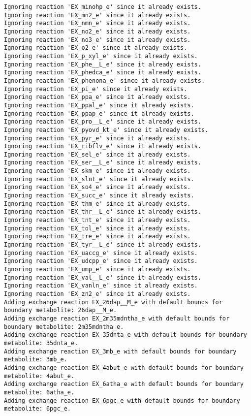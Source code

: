 \documentclass[
  letterpaper,
  DIV=11,
  numbers=noendperiod]{scrartcl}
\begin{document}
\begin{verbatim}
Ignoring reaction 'EX_minohp_e' since it already exists.
Ignoring reaction 'EX_mn2_e' since it already exists.
Ignoring reaction 'EX_nmn_e' since it already exists.
Ignoring reaction 'EX_no2_e' since it already exists.
Ignoring reaction 'EX_no3_e' since it already exists.
Ignoring reaction 'EX_o2_e' since it already exists.
Ignoring reaction 'EX_p_xyl_e' since it already exists.
Ignoring reaction 'EX_phe__L_e' since it already exists.
Ignoring reaction 'EX_phedca_e' since it already exists.
Ignoring reaction 'EX_phenona_e' since it already exists.
Ignoring reaction 'EX_pi_e' since it already exists.
Ignoring reaction 'EX_ppa_e' since it already exists.
Ignoring reaction 'EX_ppal_e' since it already exists.
Ignoring reaction 'EX_ppap_e' since it already exists.
Ignoring reaction 'EX_pro__L_e' since it already exists.
Ignoring reaction 'EX_pyovd_kt_e' since it already exists.
Ignoring reaction 'EX_pyr_e' since it already exists.
Ignoring reaction 'EX_ribflv_e' since it already exists.
Ignoring reaction 'EX_sel_e' since it already exists.
Ignoring reaction 'EX_ser__L_e' since it already exists.
Ignoring reaction 'EX_skm_e' since it already exists.
Ignoring reaction 'EX_slnt_e' since it already exists.
Ignoring reaction 'EX_so4_e' since it already exists.
Ignoring reaction 'EX_succ_e' since it already exists.
Ignoring reaction 'EX_thm_e' since it already exists.
Ignoring reaction 'EX_thr__L_e' since it already exists.
Ignoring reaction 'EX_tnt_e' since it already exists.
Ignoring reaction 'EX_tol_e' since it already exists.
Ignoring reaction 'EX_tre_e' since it already exists.
Ignoring reaction 'EX_tyr__L_e' since it already exists.
Ignoring reaction 'EX_uaccg_e' since it already exists.
Ignoring reaction 'EX_udcpp_e' since it already exists.
Ignoring reaction 'EX_ump_e' since it already exists.
Ignoring reaction 'EX_val__L_e' since it already exists.
Ignoring reaction 'EX_vanln_e' since it already exists.
Ignoring reaction 'EX_zn2_e' since it already exists.
Adding exchange reaction EX_26dap__M_e with default bounds for boundary metabolite: 26dap__M_e.
Adding exchange reaction EX_2m35mdntha_e with default bounds for boundary metabolite: 2m35mdntha_e.
Adding exchange reaction EX_35dnta_e with default bounds for boundary metabolite: 35dnta_e.
Adding exchange reaction EX_3mb_e with default bounds for boundary metabolite: 3mb_e.
Adding exchange reaction EX_4abut_e with default bounds for boundary metabolite: 4abut_e.
Adding exchange reaction EX_6atha_e with default bounds for boundary metabolite: 6atha_e.
Adding exchange reaction EX_6pgc_e with default bounds for boundary metabolite: 6pgc_e.

\end{verbatim}
\end{document}
